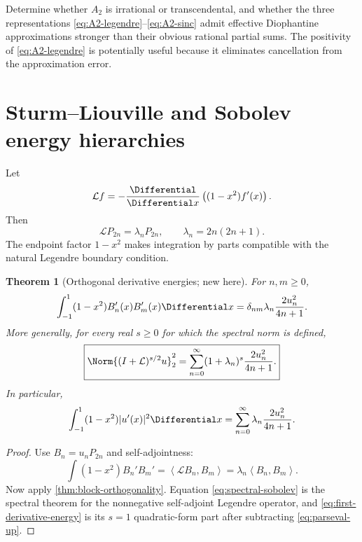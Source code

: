\documentclass[11pt,oneside]{article}
\numberwithin{equation}{section}
\newtheorem{theorem}{Theorem}[section]
\theoremstyle{definition}
\theoremstyle{remark}
\newcommand{\inner}[2]{\left\langle#1,#2\right\rangle}
\begin{document}
\begin{problem}
\label{prob:A2-arithmetic}
Determine whether $A_2$ is irrational or transcendental, and whether the three
representations \eqref{eq:A2-legendre}--\eqref{eq:A2-sinc} admit effective
Diophantine approximations stronger than their obvious rational partial sums.
The positivity of \eqref{eq:A2-legendre} is potentially useful because it
eliminates cancellation from the approximation error.
\end{problem}

\section{Sturm--Liouville and Sobolev energy hierarchies}
\label{sec:sturm}

Let
\begin{equation}
 \mathcal Lf=-\frac{\Differential}{\Differential x}\left((1-x^2)f'(x)\right).
 \label{eq:legendre-operator}
\end{equation}
Then
\begin{equation}
 \mathcal LP_{2n}=\lambda_nP_{2n},
 \qquad
 \lambda_n=2n(2n+1).
 \label{eq:eigenvalues}
\end{equation}
The endpoint factor $1-x^2$ makes integration by parts compatible with the
natural Legendre boundary condition.

\begin{theorem}[Orthogonal derivative energies; new here]
\label{thm:derivative-energies}
For $n,m\ge0$,
\begin{equation}
 \int_{-1}^{1}(1-x^2)B_n'(x)B_m'(x)\Differential x
 =\delta_{nm}\lambda_n\frac{2u_n^2}{4n+1}.
 \label{eq:block-derivative-orthogonality}
\end{equation}
More generally, for every real $s\ge0$ for which the spectral norm is defined,
\begin{equation}
 \boxed{
 \Norm{(I+\mathcal L)^{s/2}u}_2^2
 =\sum_{n=0}^{\infty}(1+\lambda_n)^s
 \frac{2u_n^2}{4n+1}.}
 \label{eq:spectral-sobolev}
\end{equation}
In particular,
\begin{equation}
 \int_{-1}^{1}(1-x^2)|u'(x)|^2\Differential x
 =\sum_{n=0}^{\infty}\lambda_n\frac{2u_n^2}{4n+1}.
 \label{eq:first-derivative-energy}
\end{equation}
\end{theorem}

\begin{proof}
Use $B_n=u_nP_{2n}$ and self-adjointness:
\[
 \int(1-x^2)B_n'B_m'=\inner{\mathcal LB_n}{B_m}
 =\lambda_n\inner{B_n}{B_m}.
\]
Now apply \cref{thm:block-orthogonality}.  Equation
\eqref{eq:spectral-sobolev} is the spectral theorem for the nonnegative
self-adjoint Legendre operator, and \eqref{eq:first-derivative-energy} is its
$s=1$ quadratic-form part after subtracting \eqref{eq:parseval-up}.
\end{proof}
\end{document}

